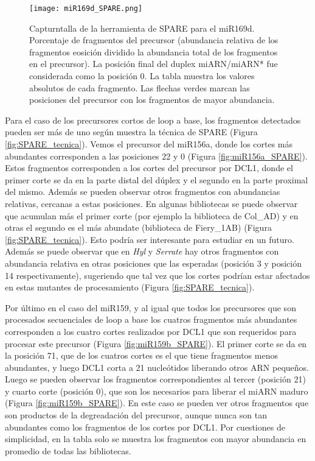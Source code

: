 \begin{landscape}                                                                      
\begin{figure}[htbp!] 
        \centering    
        \texttt{[image: miR169d\_SPARE.png]}
        \caption[Captura de pantalla de la herramienta de SPARE para el miR169d]{Capturntalla de la herramienta de SPARE para el miR169d.
        Porcentaje de fragmentos del precursor (abundancia relativa de los fragmentos eosición dividido la abundancia total de los fragmentos en el precursor).
        La posición final del duplex miARN/miARN* fue considerada como la posición 0.
        La tabla muestra los valores absolutos de cada fragmento.
        Las flechas verdes marcan las posiciones del precursor con los fragmentos de mayor abundancia. 
        }
	 \label{fig:miR169d_SPARE}
    \end{figure}
\end{landscape}

Para el caso de los precursores cortos de loop a base, los fragmentos detectados pueden ser más de uno según muestra la técnica de SPARE (Figura \ref{fig:SPARE_tecnica}).
Vemos el precursor del miR156a, donde los cortes más abundantes corresponden a las posiciones 22 y 0 (Figura \ref{fig:miR156a_SPARE}).
Estos fragmentos corresponden a los cortes del precursor por DCL1, donde el primer corte se da en la parte distal del dúplex y el segundo en la parte proximal del mismo.
Además se pueden observar otros fragmentos con abundancias relativas, cercanas a estas posiciones. 
En algunas bibliotecas se puede observar que acumulan más el primer corte (por ejemplo la biblioteca de Col\_AD) y en otras el segundo es el más abundate (biblioteca de Fiery\_1AB) (Figura \ref{fig:SPARE_tecnica}).
Esto podría ser interesante para estudiar en un futuro.
Además se puede observar que en \textit{Hyl} y \textit{Serrate} hay otros fragmentos con abundancia relativa en otras posiciones que las esperadas (posición 3 y posición 14 respectivamente), sugeriendo que tal vez que los cortes podrían estar afectados en estas mutantes de procesamiento (Figura \ref{fig:SPARE_tecnica}).

Por último en el caso del miR159, y al igual que todos los precursores que son procesados secuenciales de loop a base los cuatros fragmentos más abundantes corresponden a los cuatro cortes realizados por DCL1 que son requeridos para procesar este precursor (Figura \ref{fig:miR159b_SPARE}).
El primer corte se da en la posición 71, que de los cuatros cortes es el que tiene fragmentos menos abundantes, y luego DCL1 corta a 21 nucleótidos liberando otros ARN pequeños.
Luego se pueden observar los fragmentos correspondientes al tercer (posición 21) y cuarto corte (posición 0), que son los necesarios para liberar el miARN maduro (Figura \ref{fig:miR159b_SPARE}).
En este caso se pueden ver otros fragmentos que son productos de la degreadación del precursor, aunque nunca son tan abundantes como los fragmentos de los cortes por DCL1.
Por cuestiones de simplicidad, en la tabla solo se muestra los fragmentos con mayor abundancia en promedio de todas las bibliotecas.


